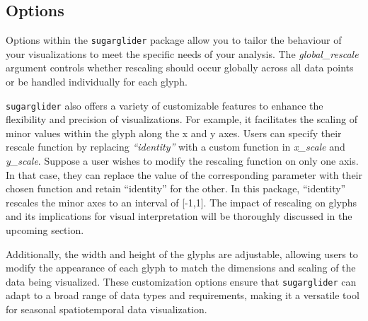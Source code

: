 \hypertarget{options}{%
\subsection{Options}\label{options}}

Options within the \texttt{sugarglider} package allow you to tailor the behaviour of your visualizations to meet the specific needs of your analysis. The \emph{global\_rescale} argument controls whether rescaling should occur globally across all data points or be handled individually for each glyph.

\texttt{sugarglider} also offers a variety of customizable features to enhance the flexibility and precision of visualizations. For example, it facilitates the scaling of minor values within the glyph along the x and y axes. Users can specify their rescale function by replacing \emph{``identity''} with a custom function in \emph{x\_scale} and \emph{y\_scale}. Suppose a user wishes to modify the rescaling function on only one axis. In that case, they can replace the value of the corresponding parameter with their chosen function and retain ``identity'' for the other. In this package, ``identity'' rescales the minor axes to an interval of {[}-1,1{]}. The impact of rescaling on glyphs and its implications for visual interpretation will be thoroughly discussed in the upcoming section.

Additionally, the width and height of the glyphs are adjustable, allowing users to modify the appearance of each glyph to match the dimensions and scaling of the data being visualized. These customization options ensure that \texttt{sugarglider} can adapt to a broad range of data types and requirements, making it a versatile tool for seasonal spatiotemporal data visualization.

